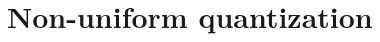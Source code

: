 \begin{comment}
In the case of a analog scalar uniform quantizer, if $R$ is the number
of bits of the quantizer per sample (for example, in the quantizer of
the Fig.~\ref{fig:cuantif}, $R=\lceil\log_2(5)\rceil=3$-bits and
$Q=8$), $\Delta$ decreases as $\frac{1}{2^R}$. Considering
Eq.~\ref{eq:MSE_uniform_scalar_quantizer} and
Eq.~\ref{eq:delta_definition}, we have that
\begin{equation}
  \text{MSE} = \frac{\Delta^2}{12} = \frac{(d_{\text max}-d_{\text
      min})^2}{12Q^2},
\end{equation}
where ${\mathbf d}_{\text max}$ and ${\mathbf d}_{\text min}$ are the
maximum and minimum decision boundary, respectively. Considering now
that $\sigma^2_{\mathbf s}=\frac{(d_{\text max}-d_{\text min})^2}{12}$
for uniform input PDF (Probability Density Function), we obtain that
\begin{equation}
  \text{MSE} = \sigma_{\mathbf s}^22^{-2R}.
\end{equation}

Now, if we add a bit to $R$, $R^{+1}=R+1$, then
\begin{equation*}
  \text{MSE}^{+1}=2^{-2(R+1)}\sigma_{\mathbf s} ^2 = 2^{-2}2^{-2R}\sigma_{\mathbf s}^2,
\end{equation*}
and
\begin{equation*}
  \text{SNR}^{+1} = 10\log_{10}\frac{\sigma_{\mathbf s}^2}{\text{MSE}^{+1}} = 10\log_{10}4\frac{\sigma_{\mathbf s}^2}{\text{MSE}} =
  10\log_{10} 4 + \text{SNR} \approx  6~\text{dB} + \text{SNR}.
\end{equation*}
This result is interesting because in a PCM system, the quality of
the signal is incremented $6$ dB with each bit. Notice that in
\href{https://en.wikipedia.org/wiki/High_fidelity}{HiFi}, the SNR
must be at least of $96$ dB, and
\begin{equation*}
  \frac{96}{6} = 16,
\end{equation*}
the number of bits per sample used in the
\href{https://en.wikipedia.org/wiki/Compact_disc}{Audio CDs}.
\end{comment}

\section{Non-uniform quantization}

\begin{comment}
Depending on how the quantizer has been designed, it can be necesary to define the so called \emph{low and high overload
regions}, respectively, that in the case of analog quantization ban be described as
\begin{equation}
  s[n] = \{\begin{array}{ll}
  {\mathbf r}_{\text{min}}, & \text{if $s(nT)<{\mathbf d}_{\text{min}}$} \\
  {\mathbf r}_{\text{max}}, & \text{if $s(nT)>{\mathbf d}_{\text{max}}$} \\
  s(nT)+e(nT), & \text{otherwise}.
  \end{array}
\end{equation}
On other occasions, and
\end{comment}


